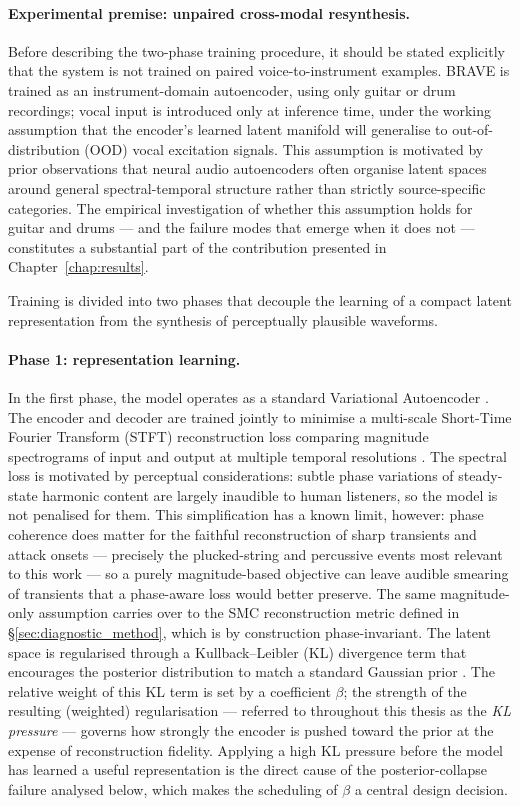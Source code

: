 \documentclass[a4paper,11pt,oneside,openany]{book}
\begin{document}
\paragraph{Experimental premise: unpaired cross-modal resynthesis.} Before describing the two-phase training procedure, it should be stated explicitly that the system is not trained on paired voice-to-instrument examples. BRAVE is trained as an instrument-domain autoencoder, using only guitar or drum recordings; vocal input is introduced only at inference time, under the working assumption that the encoder's learned latent manifold will generalise to out-of-distribution (OOD) vocal excitation signals. This assumption is motivated by prior observations that neural audio autoencoders often organise latent spaces around general spectral-temporal structure rather than strictly source-specific categories. The empirical investigation of whether this assumption holds for guitar and drums --- and the failure modes that emerge when it does not --- constitutes a substantial part of the contribution presented in Chapter~\ref{chap:results}.

Training is divided into two phases that decouple the learning of a compact latent representation from the synthesis of perceptually plausible waveforms.

\paragraph{Phase 1: representation learning.} In the first phase, the model operates as a standard Variational Autoencoder \parencite{kingma2013vae}. The encoder and decoder are trained jointly to minimise a multi-scale Short-Time Fourier Transform (STFT) reconstruction loss comparing magnitude spectrograms of input and output at multiple temporal resolutions \parencite{engel2020ddsp,caillon2021rave}. The spectral loss is motivated by perceptual considerations: subtle phase variations of steady-state harmonic content are largely inaudible to human listeners, so the model is not penalised for them. This simplification has a known limit, however: phase coherence does matter for the faithful reconstruction of sharp transients and attack onsets --- precisely the plucked-string and percussive events most relevant to this work --- so a purely magnitude-based objective can leave audible smearing of transients that a phase-aware loss would better preserve. The same magnitude-only assumption carries over to the SMC reconstruction metric defined in \S\ref{sec:diagnostic_method}, which is by construction phase-invariant. The latent space is regularised through a Kullback--Leibler (KL) divergence term that encourages the posterior distribution to match a standard Gaussian prior \parencite{kingma2013vae}. The relative weight of this KL term is set by a coefficient $\beta$; the strength of the resulting (weighted) regularisation --- referred to throughout this thesis as the \emph{KL pressure} --- governs how strongly the encoder is pushed toward the prior at the expense of reconstruction fidelity. Applying a high KL pressure before the model has learned a useful representation is the direct cause of the posterior-collapse failure analysed below, which makes the scheduling of $\beta$ a central design decision.
\end{document}
